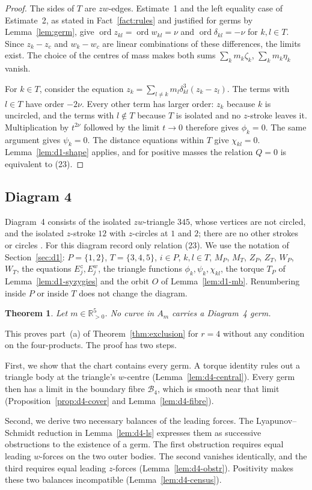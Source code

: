 \documentclass[11pt]{amsart}
\newtheorem{theorem}{Theorem}[section]
\theoremstyle{definition}
\theoremstyle{remark}
\newcommand{\Rp}{\mathbb{R}_{>0}}
\newcommand{\ord}{\operatorname{ord}}
\begin{document}
\begin{proof}
{The sides of $T$ are $zw$-edges. Estimate~1 and the left equality case of Estimate~2,
as stated in Fact~\ref{fact:rules} and justified for germs by Lemma~\ref{lem:germ}, give
$\ord z_{kl}=\ord w_{kl}=\nu$ and $\ord\delta_{kl}=-\nu$ for $k,l\in T$.
Since $z_k-z_c$ and $w_k-w_c$ are linear combinations of these differences, the limits exist.
The choice of the centres of mass makes both sums $\sum_km_k\zeta_k$, $\sum_km_k\eta_k$ vanish.

For $k\in T$, consider the equation $z_k=\sum_{l\ne k}m_l\delta_{kl}^3(z_k-z_l)$.
The terms with $l\in T$ have order $-2\nu$. Every other term has larger order:
$z_k$ because $k$ is uncircled, and the terms with $l\notin T$ because $T$ is isolated
and no $z$-stroke leaves it. Multiplication by $t^{2\nu}$ followed by the limit $t\to0$
therefore gives $\phi_k=0$. The same argument gives $\psi_k=0$.
The distance equations within $T$ give $\chi_{kl}=0$.
Lemma~\ref{lem:d1-shape} applies, and for positive masses the relation $Q=0$ is equivalent to (23).}
\end{proof}

\subsection{Diagram 4}\label{sec:d4}

Diagram~4 consists of the isolated $zw$-triangle $345$, whose vertices are not circled, and the
isolated $z$-stroke $12$ with $z$-circles at $1$ and $2$; there are no other strokes or circles
\cite[\S7.4, p.~567, and Fig.~11]{AK}.
For this diagram \cite[\S8.4]{AK} record only relation (23).  We use the notation of
Section~\ref{sec:d1}: $P=\{1,2\}$, $T=\{3,4,5\}$, $i\in P$, $k,l\in T$, $M_P$, $M_T$, $Z_P$, $Z_T$,
$W_P$, $W_T$, the equations $E^z_j,E^w_j$, the triangle functions $\phi_k,\psi_k,\chi_{kl}$, the
torque $T_P$ of Lemma~\ref{lem:d1-syzygies} and the orbit $O$ of Lemma~\ref{lem:d1-mb}.
Renumbering inside $P$ or inside $T$ does not change the diagram.

\begin{theorem}\label{thm:d4}
Let $m\in\Rp^5$.  No curve in $A_m$ carries a Diagram~4 germ.
\end{theorem}

{This proves part~(a) of Theorem~\ref{thm:exclusion} for $r=4$ without any condition
on the four-products. The proof has two steps.

First, we show that the chart contains every germ. A torque identity rules out a triangle
body at the triangle's $w$-centre (Lemma~\ref{lem:d4-central}).
Every germ then has a limit in the boundary fibre $\mathcal B_4$,
which is smooth near that limit (Proposition~\ref{prop:d4-cover} and Lemma~\ref{lem:d4-fibre}).

Second, we derive two necessary balances of the leading forces.
The Lyapunov--Schmidt reduction in Lemma~\ref{lem:d4-ls} expresses them as successive
obstructions to the existence of a germ. The first obstruction requires equal leading
$w$-forces on the two outer bodies. The second vanishes identically, and the third requires
equal leading $z$-forces (Lemma~\ref{lem:d4-obstr}).
{Positivity makes these two balances incompatible}
(Lemma~\ref{lem:d4-census}).}
\end{document}
